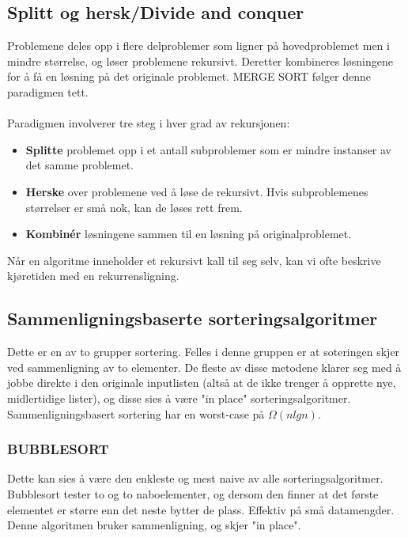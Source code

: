\subsection{Splitt og hersk/Divide and conquer}

Problemene deles opp i flere delproblemer som ligner på hovedproblemet men i mindre størrelse, og løser problemene rekursivt. Deretter kombineres løsningene for å få en løsning på det originale problemet. MERGE SORT følger denne paradigmen tett.
\\\\
Paradigmen involverer tre steg i hver grad av rekursjonen:
\begin{itemize}
    \item \textbf{Splitte} problemet opp i et antall subproblemer som er mindre instanser av det samme problemet.
    \item \textbf{Herske} over problemene ved å løse de rekursivt. Hvis subproblemenes størrelser er små nok, kan de løses rett frem.
    \item \textbf{Kombinér} løsningene sammen til en løsning på originalproblemet.
\end{itemize}

\noindent Når en algoritme inneholder et rekursivt kall til seg selv, kan vi ofte beskrive kjøretiden med en rekurrensligning.

\subsection{Sammenligningsbaserte sorteringsalgoritmer}
Dette er en av to grupper sortering. Felles i denne gruppen er at soteringen skjer ved sammenligning av to elementer. De fleste av disse metodene klarer seg med å jobbe direkte i den originale inputlisten (altså at de ikke trenger å opprette nye, midlertidige lister), og disse sies å være "in place" sorteringsalgoritmer. Sammenligningsbasert sortering har en worst-case på $\Omega(n lg n)$.

\subsubsection{BUBBLESORT}
Dette kan sies å være den enkleste og mest naive av alle sorteringsalgoritmer. Bubblesort tester to og to naboelementer, og dersom den finner at det første elementet er større enn det neste bytter de plass. Effektiv på små datamengder. Denne algoritmen bruker sammenligning, og skjer "in place".

